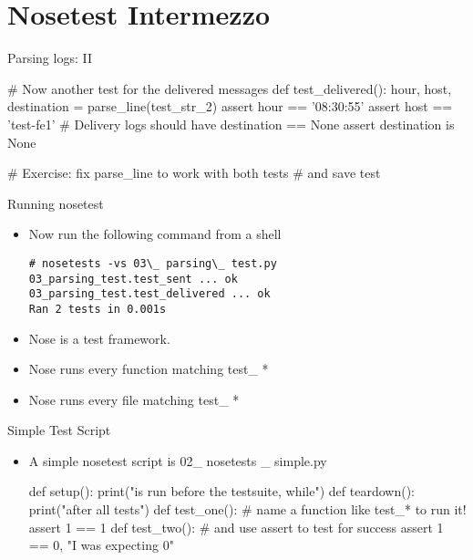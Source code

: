 \section{Nosetest Intermezzo}


\begin{frame}[fragile]{Parsing logs: II}
\begin{pythoncode}
# Now another test for the delivered messages
def test_delivered():
    hour, host, destination = parse_line(test_str_2)
    assert hour == '08:30:55'
    assert host == 'test-fe1'
    # Delivery logs should have destination == None
    assert destination is None

# Exercise: fix parse_line to work with both tests
#  and save test
\end{pythoncode}
\end{frame}


\begin{frame}[fragile]{Running nosetest}
\begin{itemize}
\item Now run the following command from a shell

\begin{verbatim}
# nosetests -vs 03\_ parsing\_ test.py  
03_parsing_test.test_sent ... ok        
03_parsing_test.test_delivered ... ok 
Ran 2 tests in 0.001s                 
\end{verbatim}
\item Nose is a test framework.
\item Nose runs every function matching test\_ *
\item Nose runs every file matching test\_ *
\end{itemize}
\end{frame}

\begin{frame}[fragile]{Simple Test Script}
\begin{itemize}
\item A simple nosetest script is 02\_ nosetests \_ simple.py
\begin{pythoncode}
def setup():
    print("is run before the testsuite, while")
def teardown():
    print("after all tests")
def test_one():
    # name a function like test_* to run it!
    assert 1 == 1 
def test_two():
    # and use assert to test for success
    assert 1 == 0, "I was expecting 0" 
\end{pythoncode}
\end{itemize}
\end{frame}


